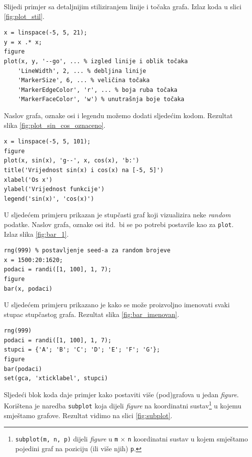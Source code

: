 \documentclass[a4paper, 10pt]{article}
\newcommand{\spec}[1]{\texttt{#1}} %
\newcommand{\eng}[1]{\emph{#1}} %
\begin{document}
\pagebreak

Slijedi primjer sa detaljnijim stiliziranjem linije i točaka grafa.
Izlaz koda u slici \ref{fig:plot_stil}.

\begin{lstlisting}
x = linspace(-5, 5, 21);
y = x .* x;
figure
plot(x, y, '--go', ... % izgled linije i oblik točaka
    'LineWidth', 2, ... % debljina linije
    'MarkerSize', 6, ... % veličina točaka
    'MarkerEdgeColor', 'r', ... % boja ruba točaka
    'MarkerFaceColor', 'w') % unutrašnja boje točaka
\end{lstlisting}

Naslov grafa, oznake osi i legendu možemo dodati sljedećim kodom.
Rezultat slika \ref{fig:plot_sin_cos_oznaceno}.

\begin{lstlisting}
x = linspace(-5, 5, 101);
figure
plot(x, sin(x), 'g--', x, cos(x), 'b:')
title('Vrijednost sin(x) i cos(x) na [-5, 5]')
xlabel('Os x')
ylabel('Vrijednost funkcije')
legend('sin(x)', 'cos(x)')
\end{lstlisting}

U sljedećem primjeru prikazan je stupčasti graf koji vizualizira neke \eng{random} podatke.
Naslov grafa, oznake osi itd.\ bi se po potrebi postavile kao za \spec{plot}.
Izlaz slika \ref{fig:bar_1}.

\begin{lstlisting}
rng(999) % postavljenje seed-a za random brojeve
x = 1500:20:1620;
podaci = randi([1, 100], 1, 7);
figure
bar(x, podaci)
\end{lstlisting}

U sljedećem primjeru prikazano je kako se može proizvoljno imenovati svaki stupac stupčastog grafa.
Rezultat slika \ref{fig:bar_imenovan}.

\begin{lstlisting}
rng(999)
podaci = randi([1, 100], 1, 7);
stupci = {'A'; 'B'; 'C'; 'D'; 'E'; 'F'; 'G'};
figure
bar(podaci)
set(gca, 'xticklabel', stupci)
\end{lstlisting}

Sljedeći blok koda daje primjer kako postaviti više (pod)grafova u jedan \eng{figure}.
Korištena je naredba \spec{subplot} koja dijeli \eng{figure} na koordinatni sustav\footnote{\spec{subplot(m, n, p)} dijeli \eng{figure} u \spec{m} $\times$ \spec{n} koordinatni sustav u kojem smještamo pojedini graf na poziciju (ili više njih) \spec{p}.} u kojemu smještamo grafove.
Rezultat vidimo na slici \ref{fig:subplot}.

\pagebreak
\end{document}
